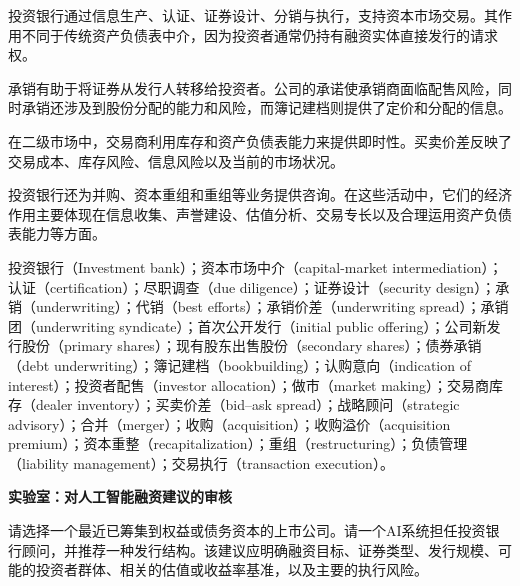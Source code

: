 

投资银行通过信息生产、认证、证券设计、分销与执行，支持资本市场交易。其作用不同于传统资产负债表中介，因为投资者通常仍持有融资实体直接发行的请求权。

承销有助于将证券从发行人转移给投资者。公司的承诺使承销商面临配售风险，同时承销还涉及到股份分配的能力和风险，而簿记建档则提供了定价和分配的信息。

在二级市场中，交易商利用库存和资产负债表能力来提供即时性。买卖价差反映了交易成本、库存风险、信息风险以及当前的市场状况。

投资银行还为并购、资本重组和重组等业务提供咨询。在这些活动中，它们的经济作用主要体现在信息收集、声誉建设、估值分析、交易专长以及合理运用资产负债表能力等方面。



投资银行（Investment bank）；资本市场中介（capital-market intermediation）；认证（certification）；尽职调查（due diligence）；证券设计（security design）；承销（underwriting）；代销（best efforts）；承销价差（underwriting spread）；承销团（underwriting syndicate）；首次公开发行（initial public offering）；公司新发行股份（primary shares）；现有股东出售股份（secondary shares）；债券承销（debt underwriting）；簿记建档（bookbuilding）；认购意向（indication of interest）；投资者配售（investor allocation）；做市（market making）；交易商库存（dealer inventory）；买卖价差（bid--ask spread）；战略顾问（strategic advisory）；合并（merger）；收购（acquisition）；收购溢价（acquisition premium）；资本重整（recapitalization）；重组（restructuring）；负债管理（liability management）；交易执行（transaction execution）。



\textbf{实验室：对人工智能融资建议的审核}

请选择一个最近已筹集到权益或债务资本的上市公司。请一个AI系统担任投资银行顾问，并推荐一种发行结构。该建议应明确融资目标、证券类型、发行规模、可能的投资者群体、相关的估值或收益率基准，以及主要的执行风险。

